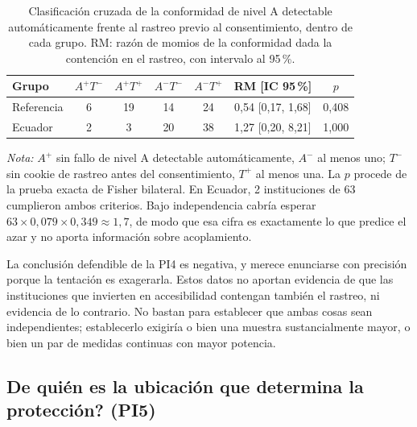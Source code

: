 \documentclass[pdflatex,sn-basic,Numbered,iicol]{sn-jnl}
\theoremstyle{thmstyleone}
\theoremstyle{thmstyletwo}
\theoremstyle{thmstylethree}
\begin{document}
\begin{table}[htbp]
	\centering
	\caption{Clasificaci\'on cruzada de la conformidad de nivel A detectable autom\'aticamente frente al rastreo previo al consentimiento, dentro de cada grupo. RM: raz\'on de momios de la conformidad dada la contenci\'on en el rastreo, con intervalo al 95\,\%.}\label{tab:joint}
	\small
	\begin{tabular}{@{}lcccccc@{}}
		\toprule
		\textbf{Grupo} & $A^{+}T^{-}$ & $A^{+}T^{+}$ & $A^{-}T^{-}$ & $A^{-}T^{+}$ & \textbf{RM [IC 95\,\%]} & \textbf{$p$} \\
		\midrule
		Referencia & 6 & 19 & 14 & 24 & 0,54 [0,17, 1,68] & 0,408 \\
		Ecuador & 2 & 3 & 20 & 38 & 1,27 [0,20, 8,21] & 1,000 \\
		\bottomrule
	\end{tabular}
	\par\vspace{3pt}
	\footnotesize\RaggedRight\textit{Nota:} $A^{+}$ sin fallo de nivel A detectable autom\'aticamente, $A^{-}$ al menos uno; $T^{-}$ sin cookie de rastreo antes del consentimiento, $T^{+}$ al menos una. La $p$ procede de la prueba exacta de Fisher bilateral. En Ecuador, 2 instituciones de 63 cumplieron ambos criterios. Bajo independencia cabr\'ia esperar $63 \times 0{,}079 \times 0{,}349 \approx 1{,}7$, de modo que esa cifra es exactamente lo que predice el azar y no aporta informaci\'on sobre acoplamiento.
\end{table}

La conclusi\'on defendible de la PI4 es negativa, y merece enunciarse con precisi\'on porque la tentaci\'on es exagerarla. Estos datos no aportan evidencia de que las instituciones que invierten en accesibilidad contengan tambi\'en el rastreo, ni evidencia de lo contrario. No bastan para establecer que ambas cosas sean independientes; establecerlo exigir\'ia o bien una muestra sustancialmente mayor, o bien un par de medidas continuas con mayor potencia.

\subsection{\textquestiondown De qui\'en es la ubicaci\'on que determina la protecci\'on? (PI5)}\label{sec:results-vantage}
\end{document}
